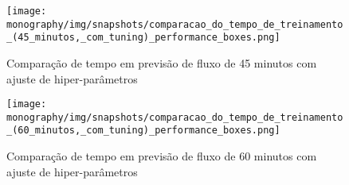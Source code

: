 \begin{figure}[htbp]
    \centering
    \texttt{[image: monography/img/snapshots/comparacao\_do\_tempo\_de\_treinamento\_(45\_minutos,\_com\_tuning)\_performance\_boxes.png]}
    \label{figure:comparacao_previsao_tempo_45_com_tuning}
    \caption{Comparação de tempo em previsão de fluxo de 45 minutos com ajuste de hiper-parâmetros}
\end{figure}

\begin{figure}[htbp]
    \centering
    \texttt{[image: monography/img/snapshots/comparacao\_do\_tempo\_de\_treinamento\_(60\_minutos,\_com\_tuning)\_performance\_boxes.png]}
    \label{figure:comparacao_previsao_tempo_60_com_tuning}
    \caption{Comparação de tempo em previsão de fluxo de 60 minutos com ajuste de hiper-parâmetros}
\end{figure}